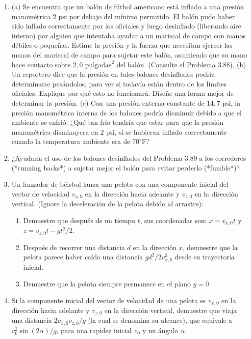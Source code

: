 \documentclass[12pt]{book}
\begin{document}
\begin{enumerate}
\item[3.89] (a) Se encuentra que un balón de fútbol americano está inflado a una presión manométrica $2\text{ psi}$ por debajo del mínimo permitido. El balón pudo haber sido inflado correctamente por los oficiales y luego desinflado (liberando aire interno) por alguien que intentaba ayudar a un mariscal de campo con manos débiles o pequeñas. Estime la presión y la fuerza que necesitan ejercer las manos del mariscal de campo para sujetar este balón, asumiendo que su mano hace contacto sobre $2{,}0\text{ pulgadas}^2$ del balón. (Consulte el Problema 3.88).
\newline
(b) Un reportero dice que la presión en tales balones desinflados podría determinarse pesándolos, para ver si todavía están dentro de los límites oficiales. Explique por qué esto no funcionará. Diseñe una forma mejor de determinar la presión.
\newline
(c) Con una presión externa constante de $14{,}7\text{ psi}$, la presión manométrica interna de los balones podría disminuir debido a que el ambiente se enfrió. ¿Qué tan frío tendría que estar para que la presión manométrica disminuyera en $2\text{ psi}$, si se hubieran inflado correctamente cuando la temperatura ambiente era de $70^\circ\text{F}$?

\item[3.90] ¿Ayudaría el uso de los balones desinflados del Problema 3.89 a los corredores (*running backs*) a sujetar mejor el balón para evitar perderlo (*fumble*)?

\item[3.91] Un lanzador de béisbol lanza una pelota con una componente inicial del vector de velocidad $v_{x,0}$ en la dirección hacia adelante y $v_{z,0}$ en la dirección vertical. (Ignore la deceleración de la pelota debido al arrastre):
\begin{enumerate}
\item[(a)] Demuestre que después de un tiempo $t$, sus coordenadas son: $x = v_{x,0}t$ y $z = v_{z,0}t - gt^2/2$.
\item[(b)] Después de recorrer una distancia $d$ en la dirección $x$, demuestre que la pelota parece haber caído una distancia $gd^2/2v_{x,0}^2$ desde su trayectoria inicial.
\item[(c)] Demuestre que la pelota siempre permanece en el plano $y = 0$.
\end{enumerate}

\item[3.92] Si la componente inicial del vector de velocidad de una pelota es $v_{x,0}$ en la dirección hacia adelante y $v_{z,0}$ en la dirección vertical, demuestre que viaja una distancia $2v_{x,0}v_{z,0}/g$ (la cual se denomina su alcance), que equivale a $v_0^2 \sin(2\alpha)/g$, para una rapidez inicial $v_0$ y un ángulo $\alpha$.


\end{enumerate}
\end{document}

